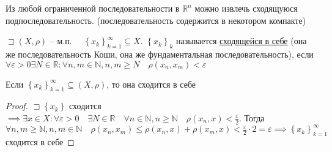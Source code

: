 \documentclass{book}
\newcommand\N{\ensuremath{\mathbb{N}}}
\newcommand\R{\ensuremath{\mathbb{R}}}
\theoremstyle{definition}
\begin{document}
\begin{corollary}
     Из любой ограниченной последовательности в $\R^n$ можно извлечь сходящуюся подпоследовательность. (последовательность содержится в некотором компакте)
\end{corollary}

\begin{definition}
    $\sqsupset (X, \rho)$ -- м.п. $\quad \left\{ x_k \right\} _{k=1}^{\infty }\subseteq X$. $\left\{ x_k \right\} _k$ называется \underline{сходящейся в себе} (она же последовательность Коши, она же фундаментальная последовательность), если $\forall \varepsilon>0\exists N\in \R: \forall n, m\in \N , n, m \geqslant N\quad \rho(x_{n} , x_{m} )<\varepsilon$
\end{definition}

\begin{statement}
    Если $\left\{ x_k \right\} _{k=1}^{\infty } \subseteq (X, \rho)$, то она сходится в себе
\end{statement}
\begin{proof}
    $\sqsupset \left\{ x_k \right\} $ сходится $\implies \exists x\in X: \forall \varepsilon>0\quad \exists N\in \R\quad \forall n\in \N , n\geqslant \N \quad \rho(x_{n} , x)<\frac{\varepsilon}{2}$. Тогда $\forall n, m\geqslant \N , n, m\in \N \quad \rho(x_{n} , x_{m} )\leqslant \rho(x_{n} , x) + \rho(x_{m} , x)<\frac{\varepsilon}{2}\cdot 2 = \varepsilon \implies \left\{ x_k \right\} _{k=1}^{\infty }$ сходится в себе
\end{proof}
\end{document}
